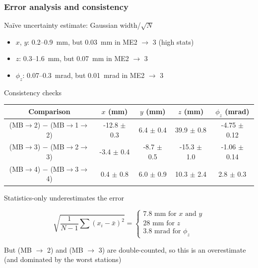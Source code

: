 \documentclass[compress]{beamer}
\begin{document}
\begin{frame}
\frametitle{Error analysis and consistency}
\small

Na\"ive uncertainty estimate: Gaussian width/$\sqrt{N}$
\begin{itemize}
\item $x$, $y$: 0.2--0.9~mm, but 0.03~mm in ME2 $\to$ 3 (high stats)
\item $z$: 0.3--1.6~mm, but 0.07~mm in ME2 $\to$ 3
\item $\phi_z$: 0.07--0.3~mrad, but 0.01~mrad in ME2 $\to$ 3
\end{itemize}

\vfill
Consistency checks
\begin{tabular}{c | c c c c}
\scriptsize Comparison & \scriptsize $x$ (mm) & \scriptsize $y$ (mm) & \scriptsize $z$ (mm) & \scriptsize $\phi_z$ (mrad) \\\hline
\scriptsize (MB$\to$2) $-$ (MB$\to$1$\to$2) & \scriptsize -12.8 $\pm$ 0.3 & \scriptsize 6.4 $\pm$ 0.4 & \scriptsize 39.9 $\pm$ 0.8 & \scriptsize -4.75 $\pm$ 0.12 \\
\scriptsize (MB$\to$3) $-$ (MB$\to$2$\to$3) & \scriptsize -3.4 $\pm$ 0.4 & \scriptsize -8.7 $\pm$ 0.5 & \scriptsize -15.3 $\pm$ 1.0 & \scriptsize -1.06 $\pm$ 0.14 \\
\scriptsize (MB$\to$4) $-$ (MB$\to$3$\to$4) & \scriptsize 0.4 $\pm$ 0.8 & \scriptsize 6.0 $\pm$ 0.9 & \scriptsize 10.3 $\pm$ 2.4 & \scriptsize 2.8 $\pm$ 0.3 \\\hline
\end{tabular}

\vfill
Statistics-only underestimates the error

\vfill
\[ \sqrt{\frac{1}{N-1} \sum (x_i - \bar{x})^2} = \left\{\begin{array}{l} \mbox{7.8~mm for $x$ and $y$} \\ \mbox{28~mm for $z$} \\ \mbox{3.8~mrad for $\phi_z$} \end{array}\right. \]

\vfill
But (MB $\to$ 2) and (MB $\to$ 3) are double-counted, so this is an
overestimate (and dominated by the worst stations)
\end{frame}
\end{document}
